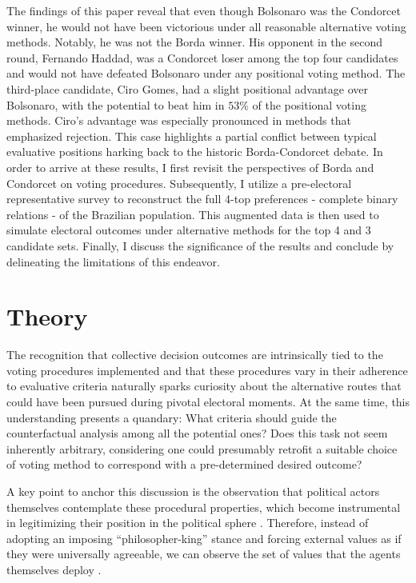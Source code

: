 \documentclass[hidelinks,11pt]{article} \usepackage[utf8]{inputenc}
\begin{document}
The findings of this paper reveal that even though Bolsonaro was the Condorcet winner, he would not have been victorious under all reasonable alternative voting methods. Notably, he was not the Borda winner. His opponent in the second round, Fernando Haddad, was a Condorcet loser among the top four candidates and would not have defeated Bolsonaro under any positional voting method. The third-place candidate, Ciro Gomes, had a slight positional advantage over Bolsonaro, with the potential to beat him in \(53\%\) of the positional voting methods. Ciro's advantage was especially pronounced in methods that emphasized rejection. This case highlights a partial conflict between typical evaluative positions harking back to the historic Borda-Condorcet debate. In order to arrive at these results, I first revisit the perspectives of Borda and Condorcet on voting procedures. Subsequently, I utilize a pre-electoral representative survey to reconstruct the full 4-top preferences - complete binary relations -  of the Brazilian population. This augmented data is then used to simulate electoral outcomes under alternative methods for the top 4 and 3 candidate sets. Finally, I discuss the significance of the results and conclude by delineating the limitations of this endeavor.

\section{Theory}

The recognition that collective decision outcomes are intrinsically tied to the voting procedures implemented and that these procedures vary in their adherence to evaluative criteria naturally sparks curiosity about the alternative routes that could have been pursued during pivotal electoral moments\parencite{tabarrok1999would, kaminski1999communism, ostrom1986agenda}. At the same time, this understanding presents a quandary: What criteria should guide the counterfactual analysis among all the potential ones? Does this task not seem inherently arbitrary, considering one could presumably retrofit a suitable choice of voting method to correspond with a pre-determined desired outcome\parencite{riker1982liberalism}?

A key point to anchor this discussion is the observation that political actors themselves contemplate these procedural properties, which become instrumental in legitimizing their position in the political sphere \parencite{mclean02_william_h, ostrom2009understanding}. Therefore, instead of adopting an imposing ``philosopher-king'' stance and forcing external values as if they were universally agreeable, we can observe the set of values that the agents themselves deploy \parencite{binmore2005natural}.
\end{document}
